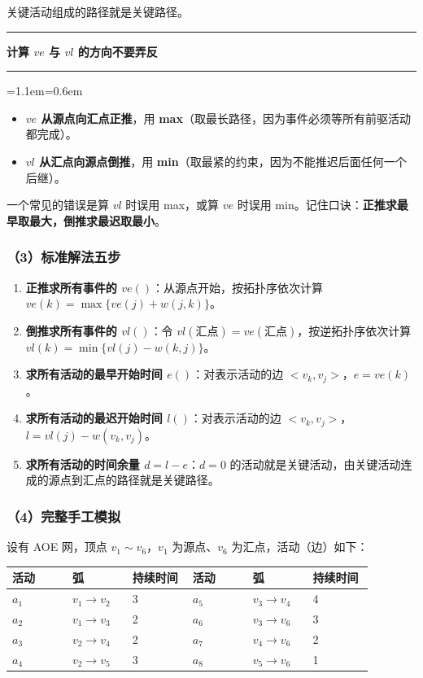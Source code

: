 \documentclass[11pt,openany,UTF8]{ctexbook}
\newcommand{\callouthead}[2]{%
  \par\addvspace{7pt}\noindent
  {\color{#1}\rule[-0.15em]{3pt}{1.05em}}\hspace{0.5em}%
  {\bfseries\color{#1}#2}\par\nobreak\vspace{-0.35em}%
  {\color{rulesep}\hrule height 0.4pt}\nobreak\vspace{0.45em}%
  \begingroup\small\setlength{\parindent}{0pt}%
  \leftskip=1.1em\rightskip=0.6em\noindent\ignorespaces}
\newcommand{\calloutend}{\par\endgroup\addvspace{7pt}}
\newenvironment{callwarn}[1]{\callouthead{warnbar}{#1}}{\calloutend}
\begin{document}
关键活动组成的路径就是关键路径。

\begin{callwarn}{计算 $ve$ 与 $vl$ 的方向不要弄反}
\begin{itemize}
\item \textbf{$ve$ 从源点向汇点正推}，用 \textbf{max}（取最长路径，因为事件必须等所有前驱活动都完成）。
\item \textbf{$vl$ 从汇点向源点倒推}，用 \textbf{min}（取最紧的约束，因为不能推迟后面任何一个后继）。
\end{itemize}
一个常见的错误是算 $vl$ 时误用 max，或算 $ve$ 时误用 min。记住口诀：\textbf{正推求最早取最大，倒推求最迟取最小}。

\end{callwarn}

\subsubsection{（3）标准解法五步}

\begin{enumerate}
\item \textbf{正推求所有事件的 $ve()$}：从源点开始，按拓扑序依次计算 $ve(k)=\max\{ve(j)+w(j,k)\}$。
\item \textbf{倒推求所有事件的 $vl()$}：令 $vl(\text{汇点})=ve(\text{汇点})$，按逆拓扑序依次计算 $vl(k)=\min\{vl(j)-w(k,j)\}$。
\item \textbf{求所有活动的最早开始时间 $e()$}：对表示活动的边 $<v_k,v_j>$，$e=ve(k)$。
\item \textbf{求所有活动的最迟开始时间 $l()$}：对表示活动的边 $<v_k,v_j>$，$l=vl(j)-w(v_k,v_j)$。
\item \textbf{求所有活动的时间余量 $d=l-e$}：$d=0$ 的活动就是关键活动，由关键活动连成的源点到汇点的路径就是关键路径。
\end{enumerate}
\subsubsection{（4）完整手工模拟}

设有 AOE 网，顶点 $v_1\sim v_6$，$v_1$ 为源点、$v_6$ 为汇点，活动（边）如下：

\begingroup\small\setlength{\tabcolsep}{4.0pt}
\begin{longtable}{@{}L{0.1462\linewidth}L{0.1462\linewidth}L{0.1462\linewidth}L{0.1462\linewidth}L{0.1462\linewidth}L{0.1462\linewidth}@{}}
\toprule
\textbf{活动} & \textbf{弧} & \textbf{持续时间} & \textbf{活动} & \textbf{弧} & \textbf{持续时间} \\
\midrule
\endhead
$a_1$ & $v_1\to v_2$ & 3 & $a_5$ & $v_3\to v_4$ & 4 \\
$a_2$ & $v_1\to v_3$ & 2 & $a_6$ & $v_3\to v_6$ & 3 \\
$a_3$ & $v_2\to v_4$ & 2 & $a_7$ & $v_4\to v_6$ & 2 \\
$a_4$ & $v_2\to v_5$ & 3 & $a_8$ & $v_5\to v_6$ & 1 \\
\bottomrule
\end{longtable}
\endgroup
\end{document}
